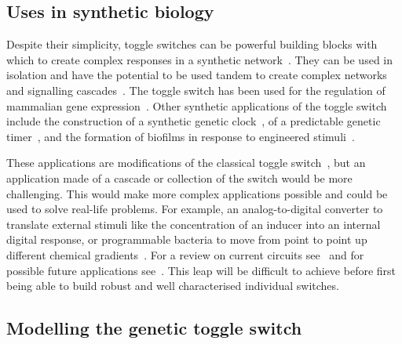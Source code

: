 \subsection{Uses in synthetic biology}
Despite their simplicity, toggle switches can be powerful building blocks with which to create complex responses in a synthetic network~\autocite{Lu:2009ez}. They can be used in isolation and have the potential to be used tandem to create complex networks and signalling cascades~\autocite{Lu:2009ez}. The toggle switch has been used for the regulation of mammalian gene expression~\autocite{Deans:2007cy, Kramer:2004kq}. Other synthetic applications of the toggle switch include the construction of a synthetic genetic clock~\autocite{Atkinson:2003tu}, of a predictable genetic timer~\autocite{Ellis:2009hka}, and the formation of biofilms in response to engineered stimuli~\autocite{Kobayashi:2004cv}. 

These applications are modifications of the classical toggle switch~\autocite{Gardner:2000vha}, but an application made of a cascade or collection of the switch would be more challenging. This would make more complex applications possible and could be used to solve real-life problems. For example, an analog-to-digital converter to translate external stimuli like the concentration of an inducer into an internal digital response, or programmable bacteria to move from point to point up different chemical gradients~\autocite{Lu:2009ez}. For a review on current circuits see~\autocite{Khalil:2010hm} and for possible future applications see~\autocite{Lu:2009ez}. This leap will be difficult to achieve before first being able to build robust and well characterised individual switches.

\subsection{Modelling the genetic toggle switch} 


